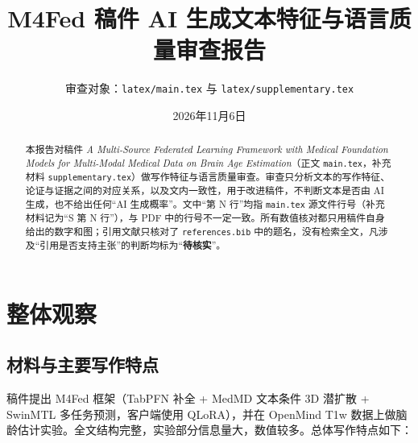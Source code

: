 \documentclass[11pt,a4paper]{ctexart}
\title{M4Fed 稿件 AI 生成文本特征与语言质量审查报告}
\author{审查对象：\texttt{latex/main.tex} 与 \texttt{latex/supplementary.tex}}
\date{2026年11月6日}
\newcommand{\verify}{\textcolor{orange!80!black}{\textbf{待核实}}}
\begin{document}
\maketitle

\begin{abstract}
本报告对稿件 \emph{A Multi-Source Federated Learning Framework with Medical Foundation Models for Multi-Modal Medical Data on Brain Age Estimation}（正文 \texttt{main.tex}，补充材料 \texttt{supplementary.tex}）做写作特征与语言质量审查。审查只分析文本的写作特征、论证与证据之间的对应关系，以及文内一致性，用于改进稿件，不判断文本是否由 AI 生成，也不给出任何“AI 生成概率”。文中“第 N 行”均指 \texttt{main.tex} 源文件行号（补充材料记为“S 第 N 行”），与 PDF 中的行号不一定一致。所有数值核对都只用稿件自身给出的数字和图；引用文献只核对了 \texttt{references.bib} 中的题名，没有检索全文，凡涉及“引用是否支持主张”的判断均标为“\verify”。
\end{abstract}

\tableofcontents
\newpage

\section{整体观察}

\subsection{材料与主要写作特点}
稿件提出 M4Fed 框架（TabPFN 补全 + MedMD 文本条件 3D 潜扩散 + SwinMTL 多任务预测，客户端使用 QLoRA），并在 OpenMind T1w 数据上做脑龄估计实验。全文结构完整，实验部分信息量大，数值较多。总体写作特点如下：
\end{document}
